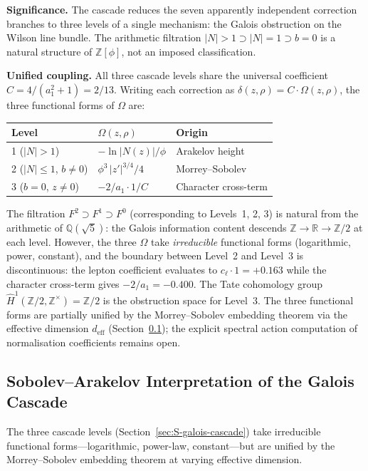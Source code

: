 \documentclass[12pt,a4paper]{article}
\theoremstyle{definition}
\begin{document}
\textbf{Significance.}  The cascade reduces the seven apparently independent correction branches to three levels of a single mechanism: the Galois obstruction on the Wilson line bundle.  The arithmetic filtration $|N| > 1 \supset |N| = 1 \supset b = 0$ is a natural structure of $\mathbb{Z}[\phi]$, not an imposed classification.

\textbf{Unified coupling.}  All three cascade levels share the universal coefficient $C = 4/(a_1^2+1) = 2/13$.  Writing each correction as $\delta(z,\rho) = C \cdot \Omega(z,\rho)$, the three functional forms of $\Omega$ are:
\begin{center}
\begin{tabular}{lll}
\toprule
\textbf{Level} & $\Omega(z,\rho)$ & \textbf{Origin} \\
\midrule
1 ($|N|>1$) & $-\ln|N(z)|/\phi$ & Arakelov height \\
2 ($|N|\leq 1$, $b\neq 0$) & $\phi^3\,|z'|^{3/4}/4$ & Morrey--Sobolev \\
3 ($b=0$, $z\neq 0$) & $-2/a_1 \cdot 1/C$ & Character cross-term \\
\bottomrule
\end{tabular}
\end{center}
The filtration $F^2 \supset F^1 \supset F^0$ (corresponding to Levels~1, 2, 3) is natural from the arithmetic of $\mathbb{Q}(\sqrt{5})$: the Galois information content descends $\mathbb{Z} \to \mathbb{R} \to \mathbb{Z}/2$ at each level.  However, the three $\Omega$ take \emph{irreducible} functional forms (logarithmic, power, constant), and the boundary between Level~2 and Level~3 is discontinuous: the lepton coefficient evaluates to $c_\ell \cdot 1 = +0.163$ while the character cross-term gives $-2/a_1 = -0.400$.  The Tate cohomology group $\hat{H}^1(\mathbb{Z}/2, \mathbb{Z}^\times) = \mathbb{Z}/2$ is the obstruction space for Level~3.  The three functional forms are partially unified by the Morrey--Sobolev embedding theorem via the effective dimension $d_{\text{eff}}$ (Section~\ref{sec:S-sobolev-arakelov}); the explicit spectral action computation of normalisation coefficients remains open.

\subsection{Sobolev--Arakelov Interpretation of the Galois Cascade}
\label{sec:S-sobolev-arakelov}

The three cascade levels (Section~\ref{sec:S-galois-cascade}) take irreducible functional forms---logarithmic, power-law, constant---but are unified by the Morrey--Sobolev embedding theorem at varying effective dimension.
\end{document}
